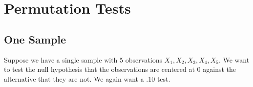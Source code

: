 %
%
%
% 
% 
%
%
%

\section{Permutation Tests}

\subsection{One Sample}

Suppose we have a single sample with 5 observations $X_1,X_2,X_3,X_4,X_5$.
We want to test the null hypothesis that the observations are centered at
0 against the alternative that they are not. We again want a .10 test.

